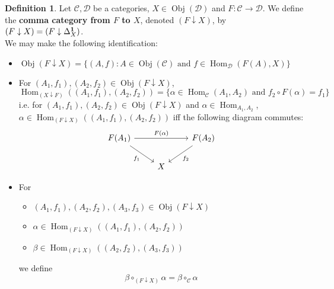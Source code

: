 \documentclass{book}
\theoremstyle{definition}
\newtheorem{defn}[definition]{Definition}
\newcommand{\al}{\alpha}
\newcommand{\be}{\beta}
\newcommand{\Del}{\Delta}
\newcommand{\MC}{\mathcal{C}}
\newcommand{\MD}{\mathcal{D}}
\DeclareMathOperator{\Obj}{Obj}
\DeclareMathOperator{\Hom}{Hom}
\DeclareMathOperator*{\0}{\mbf{0}}
\DeclareMathOperator*{\1}{\mbf{1}}
\begin{document}
	\begin{defn}
		Let $\MC, \MD$ be a categories, $X \in \Obj(\MD)$ and $F: \MC \rightarrow \MD$. We define the \textbf{comma category from $F$ to $X$}, denoted $(F \downarrow X)$, by $(F \downarrow X) = (F \downarrow \Del^{\1}_X)$.\\
		We may make the following identification:
		\begin{itemize}
			\item $\Obj(F \downarrow X) = \{(A, f): A \in \Obj(\MC) \text{ and } f \in \Hom_{\MD}(F(A), X)\}$ 
			\item For $(A_1, f_1), (A_2, f_2) \in \Obj(F \downarrow X)$, 
			$$\Hom_{(X \downarrow F)}((A_1, f_1), (A_2, f_2)) = \{\al \in \Hom_{\MC}(A_1, A_2) \text{ and } f_2 \circ F(\al)  = f_1\}$$
			i.e. for $(A_1, f_1), (A_2, f_2) \in \Obj(F \downarrow X)$ and $\al \in \Hom_{A_1, A_2}$, $\al \in \Hom_{(F \downarrow X)}((A_1, f_1), (A_2, f_2))$ iff the following diagram commutes:
			\[ 
			\begin{tikzcd}
				F(A_1) \arrow[dr, "f_1"'] \arrow[rr, "F(\al)"] &&  F(A_2) \arrow[dl, "f_2"]\\
				& X  & 
			\end{tikzcd}
			\]
			\item For 
			\begin{itemize}
				\item $(A_1, f_1), (A_2, f_2), (A_3, f_3) \in \Obj(F \downarrow X)$
				\item $\al \in \Hom_{(F \downarrow X)}((A_1, f_1), (A_2, f_2))$
				\item $\be \in \Hom_{(F \downarrow X)}((A_2, f_2), (A_3, f_3))$
			\end{itemize}
			we define 
			$$\be \circ_{(F \downarrow X)} \al = \be \circ_{\MC} \al $$
		\end{itemize}
	\end{defn}
	
	
	
	
	
	
	
	
	
	
	
	
	
	
	
	
	
	
	
	
	
	
	
	
	
	
	
	
	
	
	
\end{document}
